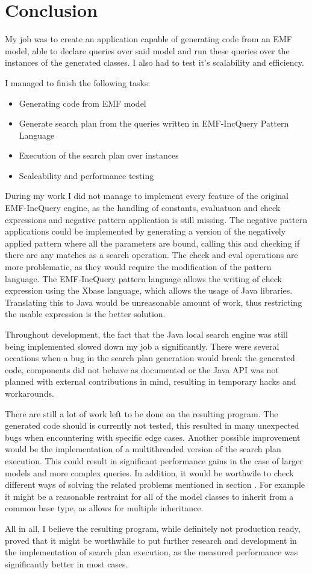 \chapter{Conclusion}

My job was to create an application capable of generating code from an EMF
model, able to declare queries over said model and run these queries over the
\CPP{} instances of the generated classes. I also had to test it's scalability
and efficiency.

I managed to finish the following tasks:

\begin{itemize}
  \item Generating code from EMF model
  \item Generate search plan from the queries written in EMF-IncQuery Pattern
  Language
  \item Execution of the search plan over \CPP{} instances
  \item Scaleability and performance testing
\end{itemize}

During my work I did not manage to implement every feature of the original
EMF-IncQuery engine, as the handling of constants, evaluatuon and check
expressions and negative pattern application is still missing. The negative
pattern applications could be implemented by generating a version of the
negatively applied pattern where all the parameters are bound, calling this and
checking if there are any matches as a search operation. The check and eval
operations are more problematic, as they would require the modification of the
pattern language. The EMF-IncQuery pattern language allows the writing of check
expression using the Xbase language, which allows the usage of Java libraries.
Translating this to Java would be unreasonable amount of work, thus restricting
the usable expression is the better solution.

Throughout development, the fact that the Java local search engine was
still being implemented slowed down my job a significantly. There were several
occations when a bug in the search plan generation would break the \CPP{}
generated code, components did not behave as documented or the Java API was not
planned with external contributions in mind, resulting in temporary hacks and
workarounds.

There are still a lot of work left to be done on the resulting program. The
generated code should is currently not tested, this resulted in many unexpected
bugs when encountering with specific edge cases. Another possible improvement
would be the implementation of a multithreaded version of the search plan
execution. This could result in significant performance gains in the case of
larger models and more complex queries. In addition, it would be worthwile to
check different ways of solving the \CPP{} related problems mentioned in section
. For example it might be a reasonable restraint
for all of the model classes to inherit from a common base type, as \CPP{}
allows for multiple inheritance.

All in all, I believe the resulting program, while definitely not production
ready, proved that it might be worthwhile to put further research and
development in the \CPP{} implementation of search plan execution, as the
measured performance was significantly better in most cases.
